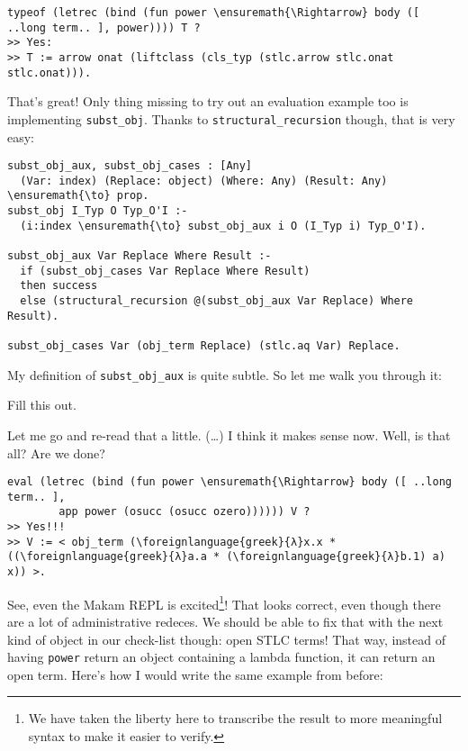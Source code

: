 \begin{verbatim}
typeof (letrec (bind (fun power \ensuremath{\Rightarrow} body ([ ..long term.. ], power)))) T ?
>> Yes:
>> T := arrow onat (liftclass (cls_typ (stlc.arrow stlc.onat stlc.onat))).
\end{verbatim}

\heroADVISOR{} That's great! Only thing missing to try out an evaluation
example too is implementing \texttt{subst\_obj}. Thanks to
\texttt{structural\_recursion} though, that is very easy:

\begin{verbatim}
subst_obj_aux, subst_obj_cases : [Any]
  (Var: index) (Replace: object) (Where: Any) (Result: Any) \ensuremath{\to} prop.
subst_obj I_Typ O Typ_O'I :-
  (i:index \ensuremath{\to} subst_obj_aux i O (I_Typ i) Typ_O'I).

subst_obj_aux Var Replace Where Result :-
  if (subst_obj_cases Var Replace Where Result)
  then success
  else (structural_recursion @(subst_obj_aux Var Replace) Where Result).

subst_obj_cases Var (obj_term Replace) (stlc.aq Var) Replace.
\end{verbatim}

\noindent
My definition of \texttt{subst\_obj\_aux} is quite subtle. So let me
walk you through it:

\heroTODO{} Fill this out.

\heroSTUDENT{} Let me go and re-read that a little. (\ldots{}) I think it
makes sense now. Well, is that all? Are we done?

\begin{verbatim}
eval (letrec (bind (fun power \ensuremath{\Rightarrow} body ([ ..long term.. ],
        app power (osucc (osucc ozero)))))) V ?
>> Yes!!!
>> V := < obj_term (\foreignlanguage{greek}{λ}x.x * ((\foreignlanguage{greek}{λ}a.a * (\foreignlanguage{greek}{λ}b.1) a) x)) >.
\end{verbatim}

\heroADVISOR{} See, even the Makam REPL is
excited\footnote{We have taken the liberty here to transcribe the result to more meaningful syntax to make it easier to verify.}!
That looks correct, even though there are a lot of administrative
redeces. We should be able to fix that with the next kind of object in
our check-list though: open STLC terms! That way, instead of having
\texttt{power} return an object containing a lambda function, it can
return an open term. Here's how I would write the same example from
before:

